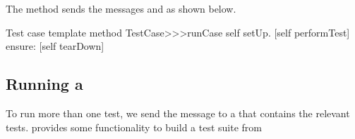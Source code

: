 \documentclass[a4paper,10pt,twoside]{book}
\begin{document}
The method  sends the messages
 and  as shown below.
\begin{method}[testcaseruncase]{Test case template method}
TestCase>>>runCase
	self setUp.
	[self performTest] ensure: [self tearDown]
\end{method}

\subsection{Running a }

To run more than one test, we send the message
 to a  that contains the relevant tests. 
 provides some functionality to build a test suite from
\end{document}
